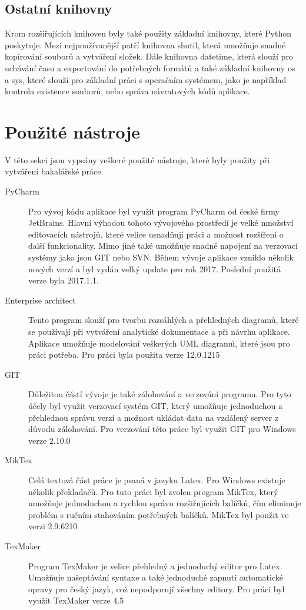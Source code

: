 \documentclass[thesis=B,czech]{resources/FITthesis}[2012/06/26]
\begin{document}
\subsection{Ostatní knihovny}
Krom rozšiřujících knihoven byly také použity základní knihovny, které Python poskytuje. Mezi nejpoužívanější patří knihovna shutil, která umožňuje snadné kopírování souborů a vytváření složek. Dále knihovna datetime, která slouží pro uchávání času a exportování do potřebných formátů a také základní knihovny os a sys, které slouží pro základní práci s operačním systémem, jako je například kontrola existence souborů, nebo správa návratových kódů aplikace.



\section{Použité nástroje}
V této sekci jsou vypsány veškeré použité nástroje, které byly použity při vytváření bakalářské práce.
\begin{description}
\item[PyCharm] Pro vývoj kódu aplikace byl využit program PyCharm od české firmy JetBrains. Hlavní výhodou tohoto vývojového prostředí je velké množství editovacích nástrojů, které velice usnadňují práci a možnost rozšíření o další funkcionality. Mimo jiné také umožňuje snadné napojení na verzovací systémy jako jsou GIT nebo SVN. Během vývoje aplikace vzniklo několik nových verzí a byl vydán velký update pro rok 2017. Poslední použitá verze byla 2017.1.1.

\item[Enterprise architect] Tento program slouží pro tvorbu rozsáhlých a přehledných diagramů, které se používají při vytváření analytické dokumentace a při návrhu aplikace. Aplikace umožňuje modelování veškerých UML diagramů, které jsou pro práci potřeba. Pro práci byla použita verze 12.0.1215

\item[GIT] Důležitou částí vývoje je také zálohování a verzování programu. Pro tyto účely byl využit verzovací systém GIT, který umožňuje jednoduchou a přehlednou správu verzí a možnost ukládat data na vzdálený server z důvodu zálohování. Pro verzování této práce byl využit GIT pro Windows verze 2.10.0

\item[MikTex] Celá textová část práce je psaná v jazyku Latex. Pro Windows existuje několik překladačů. Pro tuto práci byl zvolen program MikTex, který umožňuje jednoduchou a rychlou správu rozšiřujících balíčků, čím eliminuje problém s ručním stahováním potřebných balíčků. MikTex byl použit ve verzi 2.9.6210

\item[TexMaker] Program TexMaker je velice přehledný a jednoduchý editor pro Latex. Umožňuje našeptávání syntaxe a také jednoduché zapnutí automatické opravy pro český jazyk, což nepodporují všechny editory. Pro práci byl využit TexMaker verze 4.5
\end{description}
\end{document}
